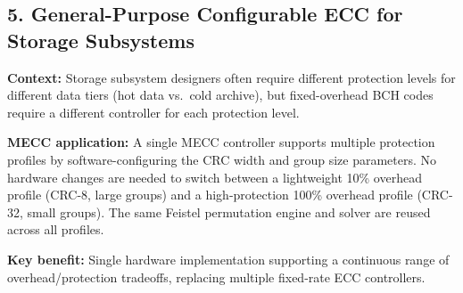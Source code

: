 \subsection*{5. General-Purpose Configurable ECC for Storage Subsystems}

\textbf{Context:} Storage subsystem designers often require different protection levels for different data tiers (hot data vs.\ cold archive), but fixed-overhead BCH codes require a different controller for each protection level.

\textbf{MECC application:} A single MECC controller supports multiple protection profiles by software-configuring the CRC width and group size parameters.
No hardware changes are needed to switch between a lightweight 10\% overhead profile (CRC-8, large groups) and a high-protection 100\% overhead profile (CRC-32, small groups).
The same Feistel permutation engine and solver are reused across all profiles.

\textbf{Key benefit:} Single hardware implementation supporting a continuous range of overhead/protection tradeoffs, replacing multiple fixed-rate ECC controllers.
